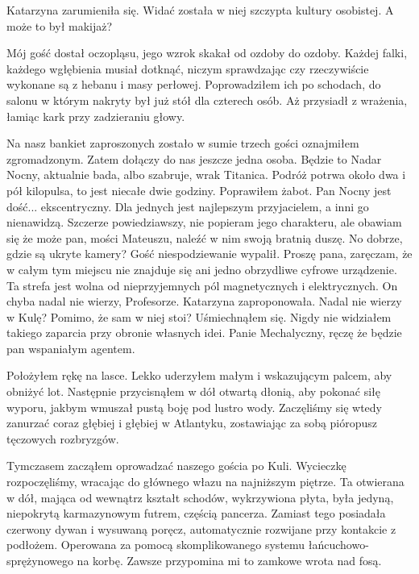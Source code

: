 Katarzyna zarumieniła się. Widać została w niej szczypta kultury osobistej. A może to był makijaż?

Mój gość dostał oczopląsu, jego wzrok skakał od ozdoby do ozdoby. 
Każdej falki, każdego wgłębienia musiał dotknąć, niczym sprawdzając czy rzeczywiście wykonane są z hebanu i masy perłowej. 
Poprowadziłem ich po schodach, do salonu w którym nakryty był już stół dla czterech osób.
Aż przysiadł z wrażenia, łamiąc kark przy zadzieraniu głowy.
\begin{dialogue}
\ds{} Na nasz bankiet zaproszonych zostało w sumie trzech gości \dm{} oznajmiłem zgromadzonym. \dm{} Zatem dołączy do nas jeszcze jedna osoba.
Będzie to Nadar Nocny, aktualnie bada, albo szabruje, wrak Titanica. Podróż potrwa około dwa i pół kilopulsa, to jest niecałe dwie godziny.
\dm{} Poprawiłem żabot. \dm{}
Pan Nocny jest dość... ekscentryczny. Dla jednych jest najlepszym przyjacielem, a inni go nienawidzą.
Szczerze powiedziawszy, nie popieram jego charakteru, ale obawiam się że może pan, mości Mateuszu, naleźć w nim swoją bratnią duszę.
\ds{} No dobrze, gdzie są ukryte kamery? \dm{} Gość niespodziewanie wypalił.
\ds{} Proszę pana, zaręczam, że w całym tym miejscu nie znajduje się ani jedno obrzydliwe cyfrowe urządzenie. 
Ta strefa jest wolna od nieprzyjemnych pól magnetycznych i elektrycznych.
\ds{} On chyba nadal nie wierzy, Profesorze. \dm{} Katarzyna zaproponowała. 
\ds{} Nadal nie wierzy w Kulę? Pomimo, że sam w niej stoi? \dm{} Uśmiechnąłem się. \dm{} 
Nigdy nie widziałem takiego zaparcia przy obronie własnych idei. Panie Mechalyczny, ręczę że będzie pan wspaniałym agentem.
\end{dialogue}

Położyłem rękę na lasce. Lekko uderzyłem małym i wskazującym palcem, aby obniżyć lot.
Następnie przycisnąłem w dół otwartą dłonią, aby pokonać siłę wyporu, jakbym wmuszał pustą boję pod lustro wody.
Zaczęliśmy się wtedy zanurzać coraz głębiej i głębiej w Atlantyku, zostawiając za sobą pióropusz tęczowych rozbryzgów.

Tymczasem zacząłem oprowadzać naszego gościa po Kuli.
Wycieczkę rozpoczęliśmy, wracając do głównego włazu na najniższym piętrze.
Ta otwierana w dół, mająca od wewnątrz kształt schodów, wykrzywiona płyta, była jedyną, niepokrytą karmazynowym futrem, częścią pancerza.
Zamiast tego posiadała czerwony dywan i wysuwaną poręcz, automatycznie rozwijane przy kontakcie z podłożem.
Operowana za pomocą skomplikowanego systemu łańcuchowo-sprężynowego na korbę. Zawsze przypomina mi to zamkowe wrota nad fosą.

